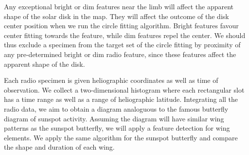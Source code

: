 \documentclass{aa}
\begin{document}
  {


    Any exceptional bright or dim features near the limb will affect the
    apparent shape of the solar disk in the map. 
    They will affect the outcome of the disk center position when we run the
    circle fitting algorithm.
    Bright features favour center fitting towards the feature,
    while dim features repel the center.
    We should thus exclude a specimen from the target set of the circle fitting
    by proximity of any pre-determined bright or dim radio feature, since these
    features affect the apparent shape of the disk.
   
    Each radio specimen is given heliographic coordinates as well as time of
    observation.
    We collect a two-dimensional histogram where each rectangular slot has a
    time range as well as a range of heliographic latitude.
    Integrating all the radio data, we aim to obtain a diagram analoguous to
    the famous butterfly diagram of sunspot activity.
    Assuming the diagram will have similar wing patterns as the sunspot
    butterfly, we will apply a feature detection for wing elements.
    We apply the same algorithm for the sunspot butterfly and compare the shape
    and duration of each wing.
  }
\end{document}
